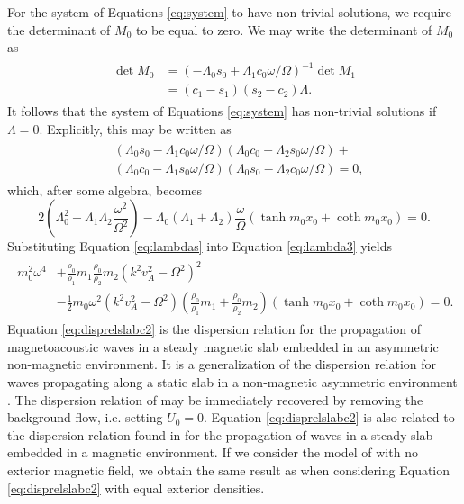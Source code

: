 \documentclass[12pt]{ociamthesis}
\begin{document}
For the system of Equations \eqref{eq:system} to have non-trivial solutions, we require the determinant of $M_0$ to be equal to zero.
We may write the determinant of $M_0$ as
%
\begin{align}
\begin{split}
\label{eq:det}
\det M_0 & = (- \Lambda_0 s_0 + \Lambda_1 c_0 \omega/\Omega)^{-1} \det M_1
\\
& = (c_1 - s_1) (s_2 - c_2) \Lambda.
\end{split}
\end{align}
%
It follows that the system of Equations \eqref{eq:system} has non-trivial solutions if $\Lambda = 0$.
Explicitly, this may be written as
%
\begin{align}
\begin{split}
\label{eq:lambda2}
& \left(\Lambda_0 s_0 - \Lambda_1 c_0 \omega/\Omega \right)
\left(\Lambda_0 c_0 - \Lambda_2 s_0 \omega/\Omega \right) +
\\
& \left(\Lambda_0 c_0 - \Lambda_1 s_0 \omega/\Omega \right)
\left( \Lambda_0 s_0 - \Lambda_2 c_0 \omega/\Omega \right) = 0,
\end{split}
\end{align}
%
which, after some algebra, becomes
%
\begin{equation}
\label{eq:lambda3}
2 \left( \Lambda_0^2 + \Lambda_1 \Lambda_2 \frac{\omega^2}{\Omega^2} \right)
- \Lambda_0 (\Lambda_1 + \Lambda_2) \frac{\omega}{\Omega} ( \tanh m_0 x_0 + \coth m_0 x_0 ) = 0.
\end{equation}
%
Substituting Equation \eqref{eq:lambdas} into Equation \eqref{eq:lambda3} yields
%
\begin{align}
\label{eq:disprelslabc2}
\begin{split}
m_0^2 \omega^4
& + \frac{\rho_0}{\rho_1} m_1 \frac{\rho_0}{\rho_2} m_2 ( k^2 v_A^2 - \Omega^2 )^2
\\[0.3cm]
& - \frac{1}{2} m_0 \omega^2 ( k^2 v_A^2 - \Omega^2) \left( \frac{\rho_0}{\rho_1} m_1 + \frac{\rho_0}{\rho_2} m_2 \right) \left( \tanh m_0 x_0 + \coth m_0 x_0 \right) = 0.
\end{split}
\end{align}
%
Equation \eqref{eq:disprelslabc2} is the dispersion relation for the propagation of magnetoacoustic waves in a steady magnetic slab embedded in an asymmetric non-magnetic environment.
It is a generalization of the dispersion relation for waves propagating along a static slab in a non-magnetic asymmetric environment \citep{Allcock2017}.
The dispersion relation of \cite{Allcock2017} may be immediately recovered by removing the background flow, i.e. setting $U_0 = 0$.
Equation \eqref{eq:disprelslabc2} is also related to the dispersion relation found in \cite{Nakariakov1995} for the propagation of waves in a steady slab embedded in a magnetic environment.
If we consider the model of \cite{Nakariakov1995} with no exterior magnetic field, we obtain the same result as when considering Equation \eqref{eq:disprelslabc2} with equal exterior densities.
\end{document}
